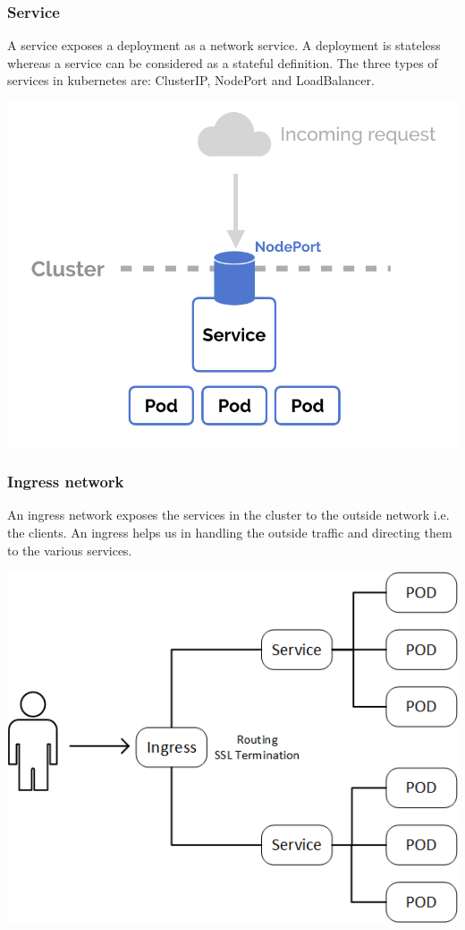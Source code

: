 \documentclass[12pt]{article}
\begin{document}
\subsubsection{Service}
A service exposes a deployment as a network service. A deployment is stateless whereas a service can be considered as a stateful definition. The three types of services in kubernetes are: ClusterIP, NodePort and LoadBalancer.\\
\begin{center}
	\includegraphics[totalheight=0.4\textheight]{service}
\end{center}
\subsubsection{Ingress network}
An ingress network exposes the services in the cluster to the outside network i.e. the clients. An ingress helps us in handling the outside traffic and directing them to the various services.\\
\begin{center}
	\includegraphics[totalheight=0.31\textheight]{ingress}
\end{center}
\end{document}
